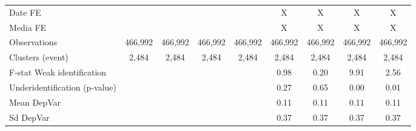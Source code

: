 {\begin{tabular}{l*{8}{c}}
\hline
Date FE             &                     &                     &                     &                     &           X         &           X         &           X         &           X         \\
Media FE            &                     &                     &                     &                     &           X         &           X         &           X         &           X         \\
Observations        &     466,992         &     466,992         &     466,992         &     466,992         &     466,992         &     466,992         &     466,992         &     466,992         \\
Clusters (event)    &       2,484         &       2,484         &       2,484         &       2,484         &       2,484         &       2,484         &       2,484         &       2,484         \\
F-stat Weak identification&                     &                     &                     &                     &        0.98         &        0.20         &        9.91         &        2.56         \\
Underidentification (p-value)&                     &                     &                     &                     &        0.27         &        0.65         &        0.00         &        0.01         \\
Mean DepVar         &                     &                     &                     &                     &        0.11         &        0.11         &        0.11         &        0.11         \\
Sd DepVar           &                     &                     &                     &                     &        0.37         &        0.37         &        0.37         &        0.37         \\
\hline\hline
\end{tabular}
}

